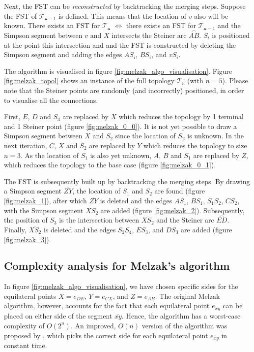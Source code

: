 \documentclass{l4proj}
\newcommand{\arc}[1]{\stackrel{\frown}{#1}}
\begin{document}
Next, the FST can be \textit{reconstructed} by backtracking the merging steps.
Suppose the FST of $\mathcal{T_{n-1}}$ is defined. This means that the location of $v$ also will be known.
There exists an FST for $\mathcal{T_n}$ $\iff$ there exists an FST for $\mathcal{T_{n-1}}$ and the Simpson segment between $v$ and $X$ intersects the Steiner arc $\arc{AB}$. $S_i$ is positioned at the point this intersection and and the FST is constructed by deleting the Simpson segment and adding the edges $AS_i$, $BS_i$, and $vS_i$.

The algorithm is visualised in figure \ref{fig:melzak_algo_visualisation}.
Figure \ref{fig:melzak_topol} shows an instance of the full topology $\mathcal{T_5}$ (with $n = 5$). Please note that the Steiner points are randomly (and incorrectly) positioned, in order to visualise all the connections.

First, $E$, $D$ and $S_3$ are replaced by $X$ which reduces the topology by 1 terminal and 1 Steiner point (figure \ref{fig:melzak_0_0}). It is not yet possible to draw a Simpson segment between $X$ and $S_2$ since the location of $S_2$ is unknown.
In the next iteration, $C$, $X$ and $S_2$ are replaced by $Y$ which reduces the topology to size $n = 3$. As the location of $S_1$ is also yet unknown, $A$, $B$ and $S_1$ are replaced by $Z$, which reduces the topology to the base case (figure \ref{fig:melzak_0_1}).

The FST is subsequently built up by backtracking the merging steps. By drawing a Simpson segment $\overline{ZY}$, the location of $S_1$ and $S_2$ are found (figure \ref{fig:melzak_1}), after which $\overline{ZY}$ is deleted and the edges $AS_1$, $BS_1$, $S_1S_2$, $CS_2$, with the Simpson segment $\overline{XS_2}$ are added (figure \ref{fig:melzak_2}).
Subsequently, the position of $S_3$ is the intersection between $\overline{XS_2}$ and the Steiner arc $\arc{ED}$. Finally, $\overline{XS_2}$ is deleted and the edges $S_2S_4$, $ES_3$, and $DS_3$ are added (figure \ref{fig:melzak_3}).


\subsection{Complexity analysis for Melzak's algorithm}
In figure \ref{fig:melzak_algo_visualisation}, we have chosen specific sides for the equilateral points $X = e_{DE}$, $Y = e_{CX}$, and $Z = e_{AB}$.
The original Melzak algorithm, however, accounts for the fact that each equilateral point $e_{xy}$ can be placed on either side of the segment $\overline{xy}$. Hence, the algorithm has a worst-case complexity of $O(2^n)$.
An improved, $O(n)$ version of the algorithm was proposed by \cite{Melzak_linear_time}, which picks the correct side for each equilateral point $e_{xy}$ in constant time.
\end{document}
